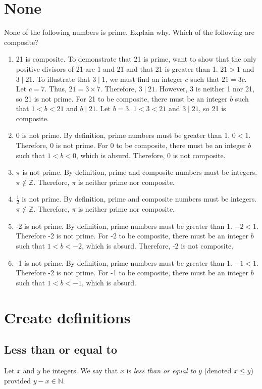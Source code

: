 \documentclass[12pt]{article}
\begin{document}
\section{None}
None of the following numbers is prime. Explain why. Which of the following are composite?
\begin{enumerate}
    \item 21 is composite. To demonstrate that 21 is prime, want to show that the only positive divisors of 21 are 1 and 21 and that 21 is greater than 1. $21>1$ and $3 \mid 21$. To illustrate that $3 \mid 1$, we must find an integer $c$ such that $21=3c$. Let $c=7$. Thus, $21=3\times 7$. Therefore, $3 \mid 21$. However, 3 is neither 1 nor 21, so 21 is not prime. For 21 to be composite, there must be an integer $b$ such that $1<b<21$ and $b \mid 21$. Let $b=3$. $1<3<21$ and $3 \mid 21$, so 21 is composite.
    \item 0 is not prime. By definition, prime numbers must be greater than 1. $0<1$. Therefore, 0 is not prime. For 0 to be composite, there must be an integer $b$ such that $1<b<0$, which is absurd. Therefore, 0 is not composite.
    \item$\pi$ is not prime. By definition, prime and composite numbers must be integers. $\pi\notin\mathbb{Z}$. Therefore, $\pi$ is neither prime nor composite.
    \item$\frac{1}{2}$ is not prime. By definition, prime and composite numbers must be integers. $\pi\notin\mathbb{Z}$. Therefore, $\pi$ is neither prime nor composite.
    \item-2 is not prime. By definition, prime numbers must be greater than 1. $-2<1$. Therefore -2 is not prime. For -2 to be composite, there must be an integer $b$ such that $1<b<-2$, which is absurd. Therefore, -2 is not composite.
    \item-1 is not prime. By definition, prime numbers must be greater than 1. $-1<1$. Therefore -2 is not prime. For -1 to be composite, there must be an integer $b$ such that $1<b<-1$, which is absurd.
\end{enumerate}
\section{Create definitions}
\subsection{Less than or equal to}
Let $x$ and $y$ be integers. We say that $x$ is \textit{less than or equal to} $y$ (denoted $x\leq y$) provided $y-x\in\mathbb{N}$.
\end{document}

